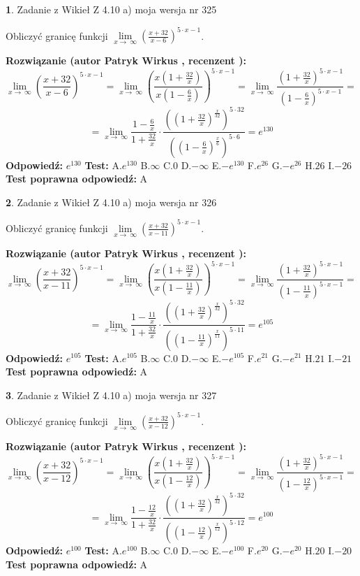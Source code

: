 \documentclass[12pt, a4paper]{article}
\theoremstyle{definition} %
\newtheorem{zad}{}
\newcommand{\zadStart}[1]{\begin{zad}#1\newline}
\newcommand{\zadStop}{\end{zad}}
\newcommand{\rozwStart}[2]{\noindent \textbf{Rozwiązanie (autor #1 , recenzent #2): }\newline}
\newcommand{\rozwStop}{\newline}
\newcommand{\odpStart}{\noindent \textbf{Odpowiedź:}\newline}
\newcommand{\odpStop}{\newline}
\newcommand{\testStart}{\noindent \textbf{Test:}\newline}
\newcommand{\testStop}{\newline}
\newcommand{\kluczStart}{\noindent \textbf{Test poprawna odpowiedź:}\newline}
\newcommand{\kluczStop}{\newline}
\begin{document}
\zadStart{Zadanie z Wikieł Z 4.10 a) moja wersja nr 325}

Obliczyć granicę funkcji  $\lim\limits_{x\to\ \infty}(\frac{x+32}{x-6})^{5\cdot x-1}$.
\zadStop
\rozwStart{Patryk Wirkus}{}
$$\lim\limits_{x\to\ \infty}(\frac{x+32}{x-6})^{5\cdot x-1} = \lim\limits_{x\to\ \infty}(\frac{x(1+\frac{32}{x})}{x(1-\frac{6}{x})})^{5\cdot x-1}=\lim\limits_{x\to\ \infty}\frac{(1+\frac{32}{x})^{5\cdot x-1}}{(1-\frac{6}{x})^{5\cdot x-1}}=$$
$$=\lim\limits_{x\to\ \infty}\frac{1-\frac{6}{x}}{1+\frac{32}{x}}\cdot\frac{((1+\frac{32}{x})^{\frac{x}{32}})^{5\cdot32}}{((1-\frac{6}{x})^{\frac{x}{6}})^{5\cdot6}}=e^{130}$$
\rozwStop
\odpStart
$e^{130}$
\odpStop
\testStart
A.$e^{130}$ B.$\infty$ C.$0$ D.$-\infty$ E.$-e^{130}$
F.$e^{26}$ G.$-e^{26}$
H.$26$
I.$-26$
\testStop
\kluczStart
A
\kluczStop



\zadStart{Zadanie z Wikieł Z 4.10 a) moja wersja nr 326}

Obliczyć granicę funkcji  $\lim\limits_{x\to\ \infty}(\frac{x+32}{x-11})^{5\cdot x-1}$.
\zadStop
\rozwStart{Patryk Wirkus}{}
$$\lim\limits_{x\to\ \infty}(\frac{x+32}{x-11})^{5\cdot x-1} = \lim\limits_{x\to\ \infty}(\frac{x(1+\frac{32}{x})}{x(1-\frac{11}{x})})^{5\cdot x-1}=\lim\limits_{x\to\ \infty}\frac{(1+\frac{32}{x})^{5\cdot x-1}}{(1-\frac{11}{x})^{5\cdot x-1}}=$$
$$=\lim\limits_{x\to\ \infty}\frac{1-\frac{11}{x}}{1+\frac{32}{x}}\cdot\frac{((1+\frac{32}{x})^{\frac{x}{32}})^{5\cdot32}}{((1-\frac{11}{x})^{\frac{x}{11}})^{5\cdot11}}=e^{105}$$
\rozwStop
\odpStart
$e^{105}$
\odpStop
\testStart
A.$e^{105}$ B.$\infty$ C.$0$ D.$-\infty$ E.$-e^{105}$
F.$e^{21}$ G.$-e^{21}$
H.$21$
I.$-21$
\testStop
\kluczStart
A
\kluczStop



\zadStart{Zadanie z Wikieł Z 4.10 a) moja wersja nr 327}

Obliczyć granicę funkcji  $\lim\limits_{x\to\ \infty}(\frac{x+32}{x-12})^{5\cdot x-1}$.
\zadStop
\rozwStart{Patryk Wirkus}{}
$$\lim\limits_{x\to\ \infty}(\frac{x+32}{x-12})^{5\cdot x-1} = \lim\limits_{x\to\ \infty}(\frac{x(1+\frac{32}{x})}{x(1-\frac{12}{x})})^{5\cdot x-1}=\lim\limits_{x\to\ \infty}\frac{(1+\frac{32}{x})^{5\cdot x-1}}{(1-\frac{12}{x})^{5\cdot x-1}}=$$
$$=\lim\limits_{x\to\ \infty}\frac{1-\frac{12}{x}}{1+\frac{32}{x}}\cdot\frac{((1+\frac{32}{x})^{\frac{x}{32}})^{5\cdot32}}{((1-\frac{12}{x})^{\frac{x}{12}})^{5\cdot12}}=e^{100}$$
\rozwStop
\odpStart
$e^{100}$
\odpStop
\testStart
A.$e^{100}$ B.$\infty$ C.$0$ D.$-\infty$ E.$-e^{100}$
F.$e^{20}$ G.$-e^{20}$
H.$20$
I.$-20$
\testStop
\kluczStart
A
\kluczStop
\end{document}
